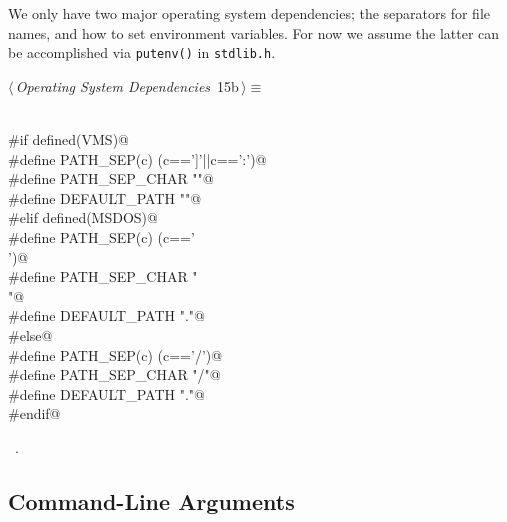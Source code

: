\documentclass[a4paper]{report}
\begin{document}
We only have two major operating system dependencies; the separators for
file names, and how to set environment variables.
For now we assume the latter can be accomplished
via \verb|putenv()| in \verb|stdlib.h|.
\begin{flushleft} \small
\begin{minipage}{\linewidth}\label{scrap16}\raggedright\small
{} $\langle\,${\it Operating System Dependencies}\nobreak\ {\footnotesize {15b}}$\,\rangle\equiv$
\vspace{-1ex}
\begin{list}{}{} \item
\mbox{}\verb@@\\
\mbox{}\verb@#if defined(VMS)@\\
\mbox{}\verb@#define PATH_SEP(c) (c==']'||c==':')@\\
\mbox{}\verb@#define PATH_SEP_CHAR ""@\\
\mbox{}\verb@#define DEFAULT_PATH ""@\\
\mbox{}\verb@#elif defined(MSDOS)@\\
\mbox{}\verb@#define PATH_SEP(c) (c=='\\')@\\
\mbox{}\verb@#define PATH_SEP_CHAR "\\"@\\
\mbox{}\verb@#define DEFAULT_PATH "."@\\
\mbox{}\verb@#else@\\
\mbox{}\verb@#define PATH_SEP(c) (c=='/')@\\
\mbox{}\verb@#define PATH_SEP_CHAR "/"@\\
\mbox{}\verb@#define DEFAULT_PATH "."@\\
\mbox{}\verb@#endif@\\
\mbox{}\verb@@{\NWsep}
\end{list}
\vspace{-1.5ex}
\footnotesize
\begin{list}{}{\setlength{\itemsep}{-\parsep}\setlength{\itemindent}{-\leftmargin}}
\item \NWtxtMacroRefIn\ .

\item{}
\end{list}
\end{minipage}\vspace{4ex}
\end{flushleft}
\subsection{Command-Line Arguments}
\end{document}
